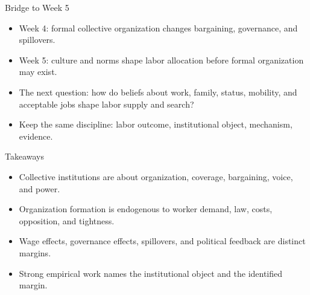 \documentclass[aspectratio=169,11pt]{beamer}
\begin{document}
\begin{frame}{Bridge to Week 5}
\begin{itemize}
    \item Week 4: formal collective organization changes bargaining, governance, and spillovers.
    \item Week 5: culture and norms shape labor allocation before formal organization may exist.
    \item The next question: how do beliefs about work, family, status, mobility, and acceptable jobs shape labor supply and search?
    \item Keep the same discipline: labor outcome, institutional object, mechanism, evidence.
\end{itemize}
\end{frame}

\begin{frame}{Takeaways}
\begin{itemize}
    \item Collective institutions are about organization, coverage, bargaining, voice, and power.
    \item Organization formation is endogenous to worker demand, law, costs, opposition, and tightness.
    \item Wage effects, governance effects, spillovers, and political feedback are distinct margins.
    \item Strong empirical work names the institutional object and the identified margin.
\end{itemize}
\end{frame}
\end{document}
